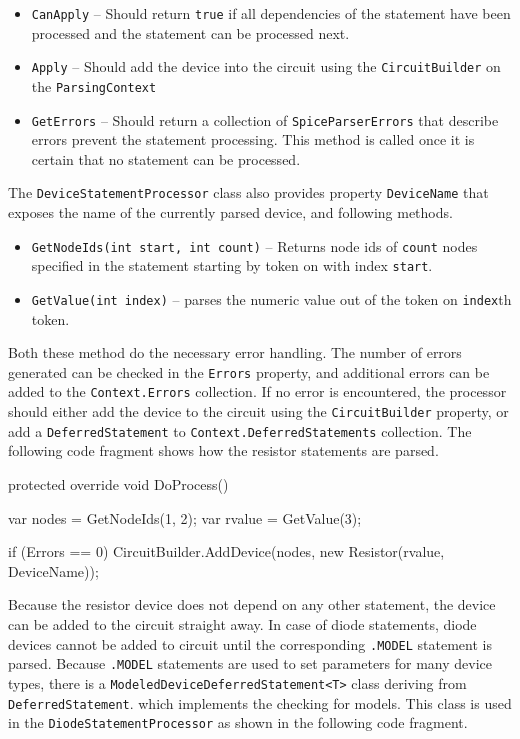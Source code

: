 \begin{itemize}
	\item \texttt{CanApply} -- Should return \texttt{true} if all dependencies of the statement have been processed and the statement can be processed next.
	\item \texttt{Apply} -- Should add the device into the circuit using the \texttt{CircuitBuilder} on the \texttt{ParsingContext}
	\item \texttt{GetErrors} -- Should return a collection of \texttt{SpiceParserErrors} that describe errors prevent the statement processing. This method is called once it is certain that no statement can be processed.
\end{itemize}

The \texttt{DeviceStatementProcessor} class also provides property \texttt{DeviceName} that exposes the name of the currently parsed device, and following methods.

\begin{itemize}
	\item \texttt{GetNodeIds(int start, int count)} -- Returns node ids of \texttt{count} nodes specified in the statement starting by token on with index \texttt{start}.
	\item \texttt{GetValue(int index)} -- parses the numeric value out of the token on \texttt{index}th token.
\end{itemize}

Both these method do the necessary error handling. The number of errors generated can be checked in the \texttt{Errors} property, and additional errors can be added to the \texttt{Context.Errors} collection. If no error is encountered, the processor should either add the device to the circuit using the \texttt{CircuitBuilder} property, or add a \texttt{DeferredStatement} to \texttt{Context.DeferredStatements} collection. The following code fragment shows how the resistor statements are parsed.

\begin{csharpcode}
protected override void DoProcess()
{
	var nodes = GetNodeIds(1, 2);
	var rvalue = GetValue(3);
	
	if (Errors == 0)
		CircuitBuilder.AddDevice(nodes, new Resistor(rvalue, DeviceName));
}
\end{csharpcode}

Because the resistor device does not depend on any other statement, the device can be added to the circuit straight away. In case of diode statements, diode devices cannot be added to circuit until the corresponding \texttt{.MODEL} statement is parsed. Because \texttt{.MODEL} statements are used to set parameters for many device types, there is a \texttt{ModeledDevice\+DeferredStatement<T>} class deriving from \texttt{DeferredStatement}. which implements the checking for models. This class is used in the \texttt{DiodeStatementProcessor} as shown in the following code fragment.

